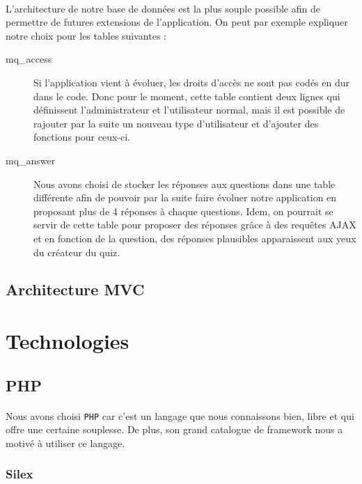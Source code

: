 \documentclass[12pt]{article}
\begin{document}
        \paragraph{}
        L'architecture de notre base de données est la plus souple possible afin de permettre de futures extensions de l'application. On peut par exemple expliquer notre choix pour les tables suivantes :
        \begin{description}
            \item[mq\_access] Si l'application vient à évoluer, les droits d'accès ne sont pas codés en dur dans le code. Donc pour le moment, cette table contient deux lignes qui définissent l'administrateur et l'utilisateur normal, mais il est possible de rajouter par la suite un nouveau type d'utilisateur et d'ajouter des fonctions pour ceux-ci.
            \item[mq\_answer] Nous avons choisi de stocker les réponses aux questions dans une table différente afin de pouvoir par la suite faire évoluer notre application en proposant plus de 4 réponses à chaque questions. Idem, on pourrait se servir de cette table pour proposer des réponses grâce à des requêtes AJAX et en fonction de la question, des réponses plausibles apparaissent aux yeux du créateur du quiz.
        \end{description}
    
    \subsection{Architecture MVC}

\section{Technologies}
    \subsection{PHP}
        \paragraph{} Nous avons choisi \texttt{PHP} car c'est un langage que nous connaissons bien, libre et qui offre une certaine souplesse. De plus, son grand catalogue de framework nous a motivé à utiliser ce langage. 
    
        \subsubsection{Silex}
\end{document}
